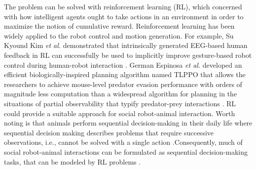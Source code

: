 The problem can be solved with reinforcement learning (RL), which concerned with how
intelligent agents ought to take actions in an environment in order to maximize
the notion of cumulative reward. Reinforcement learning has been widely applied
to the robot control and motion generation. For example, Su Kyound Kim \textit{et
al.} demonstrated that intrinsically generated EEG-based human feedback in RL
can successfully be used to implicitly improve gesture-based robot control
during human-robot interaction \cite{erp-hr-interaction}. German Espinosa
\textit{et al.} developed an efficient biologically-inspired planning algorithm
named TLPPO that allows the researchers to achieve mouse-level predator evasion
performance with orders of magnitude less computation than a widespread
algorithm for planning in the situations of partial observability that typify
predator-prey interactions \cite{arxiv-mouse-level-evasion}. RL could provide a
suitable approach for social robot-animal interaction. Worth noting is that
animals perform sequential decision-making in their daily life where sequential
decision making describes problems that require successive observations, i.e.,
cannot be solved with a single action \cite{GUPTA202275}.Consequently, much of
social robot-animal interactions can be formulated as sequential decision-making
tasks, that can be modeled by RL problems \cite{s21041292}.



